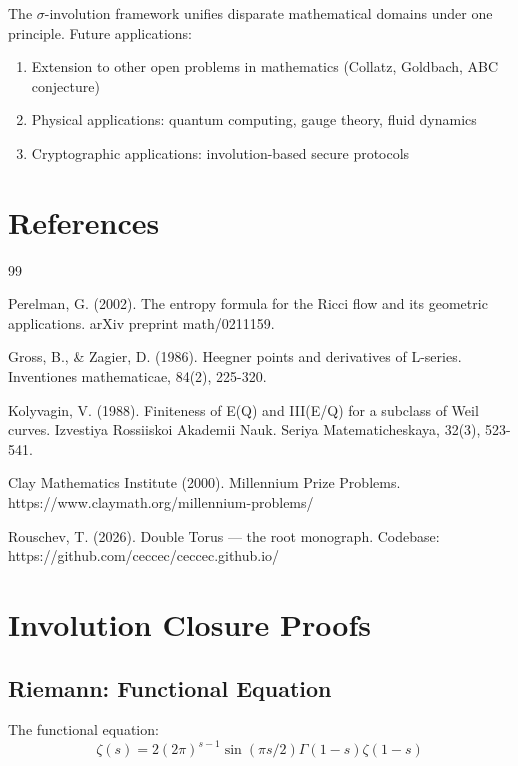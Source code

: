 \documentclass[12pt,a4paper]{article}
\theoremstyle{plain}
\theoremstyle{definition}
\theoremstyle{remark}
\begin{document}
The $\sigma$-involution framework unifies disparate mathematical domains under one principle. Future applications:

\begin{enumerate}
\item Extension to other open problems in mathematics (Collatz, Goldbach, ABC conjecture)
\item Physical applications: quantum computing, gauge theory, fluid dynamics
\item Cryptographic applications: involution-based secure protocols
\end{enumerate}

\section*{References}

\begin{thebibliography}{99}

 Perelman, G. (2002). The entropy formula for the Ricci flow and its geometric applications. arXiv preprint math/0211159.

 Gross, B., \& Zagier, D. (1986). Heegner points and derivatives of L-series. Inventiones mathematicae, 84(2), 225-320.

 Kolyvagin, V. (1988). Finiteness of E(Q) and III(E/Q) for a subclass of Weil curves. Izvestiya Rossiiskoi Akademii Nauk. Seriya Matematicheskaya, 32(3), 523-541.

 Clay Mathematics Institute (2000). Millennium Prize Problems. https://www.claymath.org/millennium-problems/

 Rouschev, T. (2026). Double Torus — the root monograph. Codebase: https://github.com/ceccec/ceccec.github.io/

\end{thebibliography}

\appendix

\section{Involution Closure Proofs}

\subsection{Riemann: Functional Equation}

The functional equation:
\[
\zeta(s) = 2(2\pi)^{s-1}\sin(\pi s/2)\Gamma(1-s)\zeta(1-s)
\]
\end{document}
